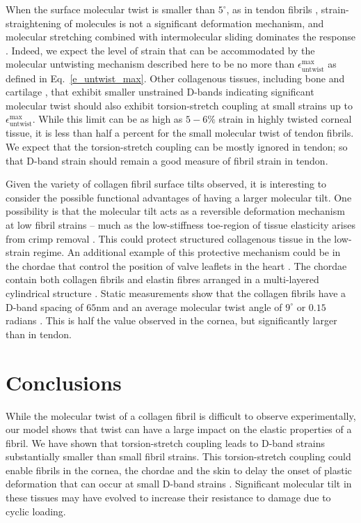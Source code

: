 \documentclass[preprint,12pt]{elsarticle}
\begin{document}
When the surface molecular twist is smaller than $5^\circ$, as in tendon fibrils \cite{Hulmes:1981}, strain-straightening of molecules is not a significant deformation mechanism, and molecular stretching combined with intermolecular sliding dominates the response \cite{Sasaki:1996, Gautieri:2017}. Indeed, we expect the level of strain that can be accommodated by the molecular untwisting mechanism described here to be no more than $\epsilon_\mathrm{untwist}^\mathrm{max}$ as defined in Eq.~\ref{e_untwist_max}. Other collagenous tissues, including bone \cite{Almer:2005, Zimmermann:2011, Xi:2020} and cartilage \cite{Inamdar:2019}, that exhibit smaller unstrained D-bands indicating significant molecular twist should also exhibit torsion-stretch coupling at small strains up to $\epsilon_\mathrm{untwist}^\mathrm{max}$. While this limit can be as high as $5-6\%$ strain in highly twisted corneal tissue, it is less than half a percent for the small molecular twist of tendon fibrils.  We expect that the torsion-stretch coupling can be mostly ignored in tendon; so that D-band strain should remain a good measure of fibril strain in tendon.

Given the variety of collagen fibril surface tilts observed, it is interesting to consider the possible functional advantages of having a larger molecular tilt. One possibility is that the molecular tilt acts as a reversible deformation mechanism at low fibril strains -- much as the low-stiffness toe-region of tissue elasticity arises from crimp removal \cite{Fratzl:1998}. This could protect structured collagenous tissue in the low-strain regime. An additional example of this protective mechanism could be in the chordae that control the position of valve leaflets in the heart \cite{Ross:2020}. The chordae contain both collagen fibrils and elastin fibres arranged in a multi-layered cylindrical structure \cite{Millington:1998}. Static measurements show that the collagen fibrils have a D-band spacing of $65\mathrm{nm}$ and an average molecular twist angle of $9^\circ$ or $0.15$ radians \cite{Folkhard:1987}. This is half the value observed in the cornea, but significantly larger than in tendon.

\section{Conclusions}
\label{sec:conclusion}
While the molecular twist of a collagen fibril is difficult to observe experimentally, our model shows that twist can have a large impact on the elastic properties of a fibril. We have shown that torsion-stretch coupling leads to D-band strains substantially smaller than small fibril strains. This torsion-stretch coupling could enable fibrils in the cornea, the chordae and the skin to delay the onset of plastic deformation that can occur at small D-band strains \cite{Gautieri:2017}. Significant molecular tilt in these tissues may have evolved to increase their resistance to damage due to cyclic loading.
\end{document}
